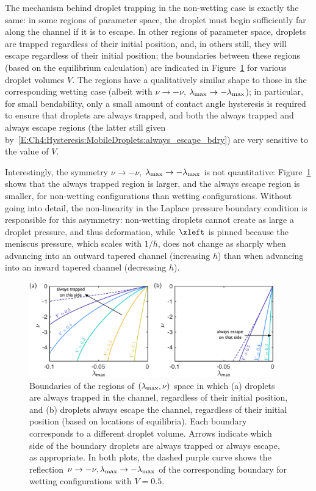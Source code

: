 The mechanism behind droplet trapping in the non-wetting case is exactly the same: in some regions of parameter space, the droplet must begin sufficiently far along the channel if it is to escape. In other regions of parameter space, droplets are trapped regardless of their initial position, and, in others still, they will escape regardless of their initial position; the boundaries between these regions (based on the equilibrium calculation) are indicated in Figure~\ref{fig:Ch4:Hysteresis:trapping_regions_nonwetting} for various droplet volumes $V$. The regions have a qualitatively similar shape to those in the corresponding wetting case (albeit with $\nu \to -\nu$, $\lambda_{\text{max}} \to -\lambda_{\text{max}}$); in particular, for small bendability, only a small amount of contact angle hysteresis is required to ensure that droplets are always trapped, and both the always trapped and always escape regions (the latter still given by~\eqref{E:Ch4:Hysteresis:MobileDroplets:always_escape_bdry}) are very sensitive to the value of $V$.

Interestingly, the symmetry $\nu \to -\nu$, $\lambda_{\text{max}} \to -\lambda_{\text{max}}$ is not quantitative: Figure~\ref{fig:Ch4:Hysteresis:trapping_regions_nonwetting} shows that the always trapped region is larger, and the always escape region is smaller, for non-wetting configurations than wetting configurations. Without going into detail, the non-linearity in the Laplace pressure boundary condition is responsible for this asymmetry: non-wetting droplets cannot create as large a droplet pressure, and thus deformation, while $\xleft$ is pinned because the meniscus pressure, which scales with $1/h$, does not change as sharply when advancing into an outward tapered channel (increasing $h$) than when advancing into an inward tapered channel (decreasing $h$).

\begin{figure}
\centering
\includegraphics[width = 0.95\textwidth]{non_wetting_escape_and_trapped_regions}
\caption{Boundaries of the regions of $(\lambda_{\text{max}}, \nu)$ space in which (a) droplets are always trapped in the channel, regardless of their initial position, and (b) droplets always escape the channel, regardless of their initial position (based on locations of equilibria). Each boundary corresponds to a different droplet volume. Arrows indicate which side of the boundary droplets are always trapped or always escape, as appropriate. In both plots, the dashed purple curve shows the reflection $\nu \to -\nu, \lambda_{\text{max}} \to -\lambda_{\text{max}}$ of the corresponding boundary for wetting configurations with $V = 0.5$. }\label{fig:Ch4:Hysteresis:trapping_regions_nonwetting}
\end{figure}

